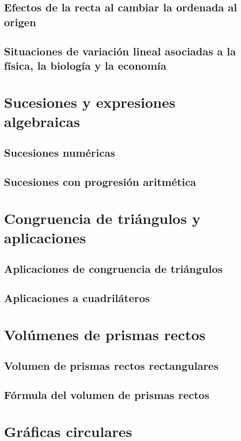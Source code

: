 \documentclass[11pt]{book}
\begin{document}
\subsection{Efectos de la recta al cambiar la ordenada al origen}
\subsection{Situaciones de variación lineal asociadas a la física, la biología y la economía}

\newpage
\section{Sucesiones y expresiones algebraicas}
\subsection{Sucesiones numéricas}
\subsection{Sucesiones con progresión aritmética}

\newpage
\section{Congruencia de triángulos y aplicaciones}
\subsection{Aplicaciones de congruencia de triángulos}
\subsection{Aplicaciones a cuadriláteros}

\newpage
\section{Vol\'umenes de prismas rectos}
\subsection{Volumen de prismas rectos rectangulares}
\subsection{Fórmula del volumen de prismas rectos}

\newpage
\section{Gráficas circulares}
\end{document}
